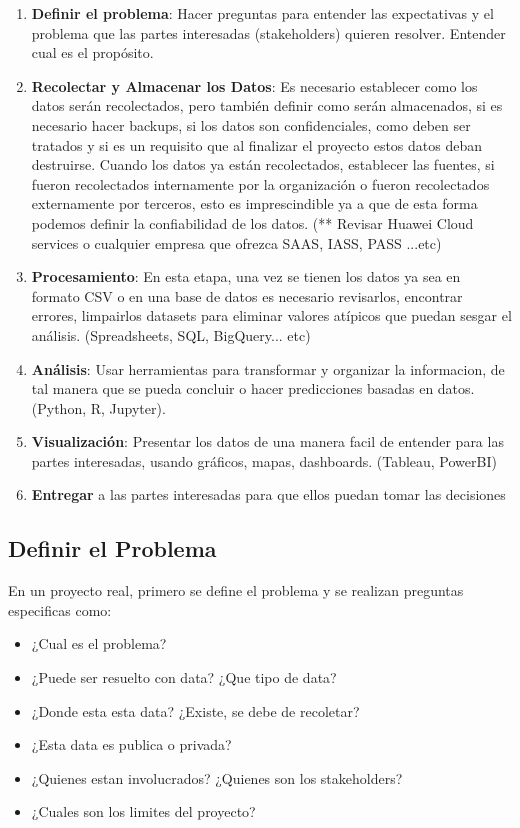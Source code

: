 \documentclass[12pt,a4paper,openright]{article}
\begin{document}
\begin{enumerate}
    \item \textbf{Definir el problema}: Hacer preguntas para entender las expectativas y el problema que las partes interesadas (stakeholders) quieren resolver. Entender cual es el propósito.
    \item \textbf{Recolectar y Almacenar los Datos}: Es necesario establecer como los datos serán recolectados, pero también definir como serán almacenados, si es necesario hacer backups, si los datos son confidenciales, como deben ser tratados y si es un requisito que al finalizar el proyecto estos datos deban destruirse. Cuando los datos ya están recolectados, establecer las fuentes, si fueron recolectados internamente por la organización o fueron recolectados externamente por terceros, esto es imprescindible ya a que de esta forma podemos definir la confiabilidad de los datos. (** Revisar Huawei Cloud services o cualquier empresa que ofrezca SAAS, IASS, PASS ...etc)
    \item \textbf{Procesamiento}: En esta etapa, una vez se tienen los datos ya sea en formato CSV o en una base de datos es necesario revisarlos, encontrar errores, limpairlos datasets para eliminar valores atípicos que puedan sesgar el análisis. (Spreadsheets, SQL, BigQuery... etc)
    \item \textbf{An\'alisis}: Usar herramientas para transformar y organizar la informacion, de tal manera que se pueda concluir o hacer predicciones basadas en datos. (Python, R, Jupyter).
    \item \textbf{Visualización}: Presentar los datos de una manera facil de entender para las partes interesadas, usando gráficos, mapas, dashboards. (Tableau, PowerBI)
    \item \textbf{Entregar} a las partes interesadas para que ellos puedan tomar las decisiones
\end{enumerate}





\subsection{Definir el Problema}
En un proyecto real, primero se define el problema y se realizan preguntas especificas como:
\begin{itemize}
    \item ¿Cual es el problema?
    \item ¿Puede ser resuelto con data? ¿Que tipo de data?
    \item ¿Donde esta esta data? ¿Existe, se debe de recoletar?
    \item ¿Esta data es publica o privada?
    \item ¿Quienes estan involucrados? ¿Quienes son los stakeholders?
    \item ¿Cuales son los limites del proyecto?
\end{itemize}
\end{document}

